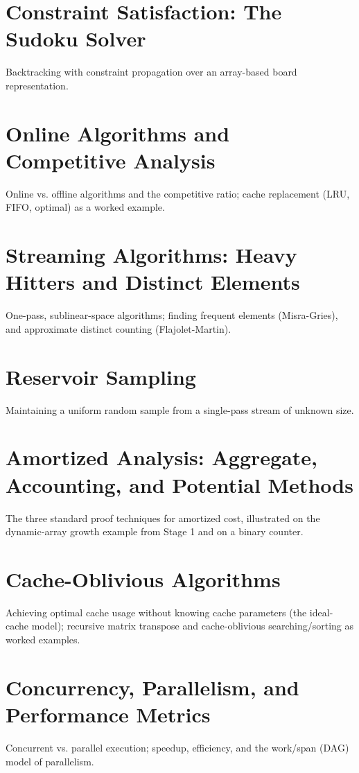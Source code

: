 \chapter{Constraint Satisfaction: The Sudoku Solver}
Backtracking with constraint propagation over an array-based board representation.

\chapter{Online Algorithms and Competitive Analysis}
Online vs. offline algorithms and the competitive ratio; cache replacement (LRU, FIFO, optimal) as a worked example.

\chapter{Streaming Algorithms: Heavy Hitters and Distinct Elements}
One-pass, sublinear-space algorithms; finding frequent elements (Misra-Gries), and approximate distinct counting (Flajolet-Martin).

\chapter{Reservoir Sampling}
Maintaining a uniform random sample from a single-pass stream of unknown size.

\chapter{Amortized Analysis: Aggregate, Accounting, and Potential Methods}
The three standard proof techniques for amortized cost, illustrated on the dynamic-array growth example from Stage 1 and on a binary counter.

\chapter{Cache-Oblivious Algorithms}
Achieving optimal cache usage without knowing cache parameters (the ideal-cache model); recursive matrix transpose and cache-oblivious searching/sorting as worked examples.


\chapter{Concurrency, Parallelism, and Performance Metrics}
Concurrent vs. parallel execution; speedup, efficiency, and the work/span (DAG) model of parallelism.


